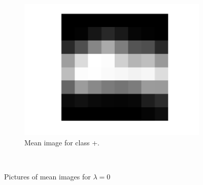 \documentclass[a4paper,10pt]{article}
\begin{document}
\begin{itemize}
\begin{figure}[h]
            \begin{subfigure}[b]{0.45\textwidth}
                \includegraphics[width=\textwidth]{mn_0.png}
                \caption{Mean image for class +.}
                \label{fig:mean image 0-}
            \end{subfigure}
            ~ %
            \caption{Pictures of mean images for $\lambda =0$}\label{fig:mean image 0}
        \end{figure}
        

\end{itemize}
\end{document}

